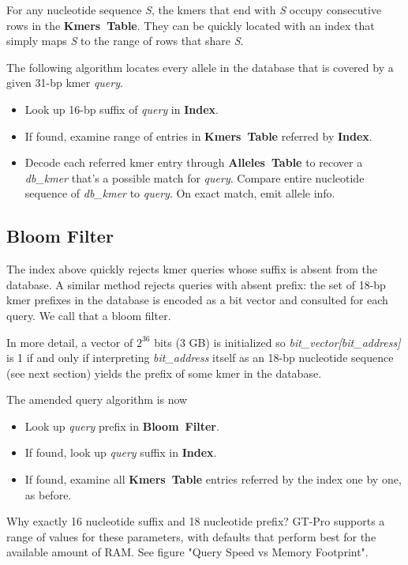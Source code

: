 \documentclass[10pt]{article}
\newcommand\datastructure[1]{\hbox{\textbf{#1}}}
\newcommand\AllelesTable{\datastructure{Alleles Table}}
\newcommand\KmersTable{\datastructure{Kmers Table}}
\newcommand\Index{\datastructure{Index}}
\newcommand\BloomFilter{\datastructure{Bloom Filter}}
\newcommand\var[1]{\hbox{\textsl{#1}}}
\begin{document}
For any nucleotide sequence \var{S}, the kmers that end with \var{S} occupy consecutive rows in the \KmersTable{}.  They can be quickly located with an index that simply maps \var{S} to the range of rows that share \var{S}.

The following algorithm locates every allele in the database that is covered by a given 31-bp kmer \var{query}.
\begin{itemize}
\item Look up 16-bp suffix of \var{query} in \Index{}.
\item If found, examine range of entries in \KmersTable{} referred by \Index{}.
\item Decode each referred kmer entry through \AllelesTable{} to recover a \var{db_kmer} that's a possible match for \var{query}.  Compare entire nucleotide sequence of \var{db_kmer} to \var{query}. On exact match, emit allele info.
\end{itemize}


\subsection{Bloom Filter}
The index above quickly rejects kmer queries whose suffix is absent from the database.  A similar method rejects queries with absent prefix:  the set of 18-bp kmer prefixes in the database is encoded as a bit vector and consulted for each query.  We call that a bloom filter.

In more detail, a vector of $\text{2}^\text{36}$ bits (3 GB) is initialized so \var{bit_vector[bit_address]} is 1 if and only if interpreting \var{bit_address} itself as an 18-bp nucleotide sequence (see next section) yields the prefix of some kmer in the database.

The amended query algorithm is now
\begin{itemize}
\item Look up \var{query} prefix in \BloomFilter{}.
\item If found, look up \var{query} suffix in \Index{}.
\item If found, examine all \KmersTable{} entries referred by the index one by one, as before.
\end{itemize}

Why exactly 16 nucleotide suffix and 18 nucleotide prefix?  GT-Pro supports a range of values for these parameters, with defaults that perform best for the available amount of RAM.  See figure "Query Speed vs Memory Footprint".
\end{document}
